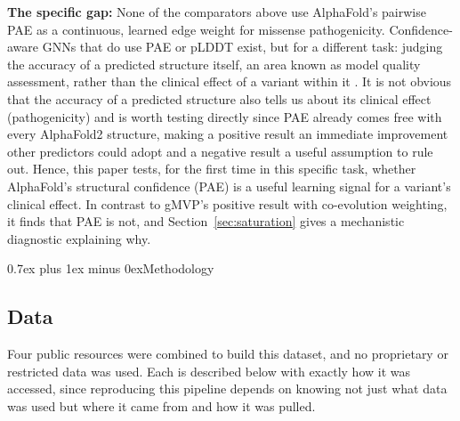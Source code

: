 \documentclass[10pt,conference,a4paper]{IEEEtran}
\makeatletter
\def\section{\@startsection{section}{1}{\z@}{1.5ex plus 1.5ex minus 0.5ex}%
{0.7ex plus 1ex minus 0ex}{\normalfont\normalsize\bfseries\centering}}%
\makeatother
\begin{document}
\textbf{The specific gap:} None of the comparators above use AlphaFold's pairwise PAE as a continuous, learned edge weight for missense pathogenicity. Confidence-aware GNNs that do use PAE or pLDDT exist, but for a different task: judging the accuracy of a predicted structure itself, an area known as model quality assessment, rather than the clinical effect of a variant within it \cite{chen2023enqa}. It is not obvious that the accuracy of a predicted structure also tells us about its clinical effect (pathogenicity) and is worth testing directly since PAE already comes free with every AlphaFold2 structure, making a positive result an immediate improvement other predictors could adopt and a negative result a useful assumption to rule out. Hence, this paper tests, for the first time in this specific task, whether AlphaFold's structural confidence (PAE) is a useful learning signal for a variant's clinical effect. In contrast to gMVP's positive result with co-evolution weighting, it finds that PAE is not, and Section~\ref{sec:saturation} gives a mechanistic diagnostic explaining why.

\section{Methodology}
\label{sec:methodology}

\subsection{Data}
\label{sec:data}

Four public resources were combined to build this dataset, and no proprietary or restricted data was used. Each is described below with exactly how it was accessed, since reproducing this pipeline depends on knowing not just what data was used but where it came from and how it was pulled.
\end{document}
